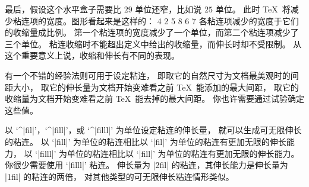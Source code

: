 {%
最后，假设这个水平盒子需要比 $29$ 单位还窄，比如说 $25$ 单位。
此时 \TeX\ 将减少粘连项的宽度。图形看起来是这样的：
 {  4 2 5   8 6 7  }
各粘连项减少的宽度于它们的收缩量成比例。
第一个粘连项的宽度减少了一个单位，而第二个粘连项减少了三个单位。
粘连收缩时不能超出定义中给出的收缩量，而伸长时却不受限制。
从这个重要意义上说，收缩和伸长有不同的表现。

有一个不错的经验法则可用于设定粘连，
即取它的自然尺寸为文档最美观时的间距大小，
取它的伸长量为文档开始变难看之前 \TeX\ 能添加的最大间距，
取它的收缩量为文档开始变难看之前 \TeX\ 能去掉的最大间距。
你也许需要通过试验确定这些值。

以 `^|fil|'，`^|fill|'，或 `^|filll|' 为单位设定粘连的伸长量，
就可以生成可无限伸长的粘连。
以 `|fill|' 为单位的粘连相比以 `|fil|' 为单位的粘连有更加无限的伸长能力，
以 `|filll|' 为单位的粘连相比以 `|fill|' 为单位的粘连有更加无限的伸长能力。
你很少需要使用 `|filll|' 粘连。
伸长量为 |2fil| 的粘连，其伸长能力是伸长量为 |1fil| 的粘连的两倍，
对其他类型的可无限伸长粘连情形类似。

}
